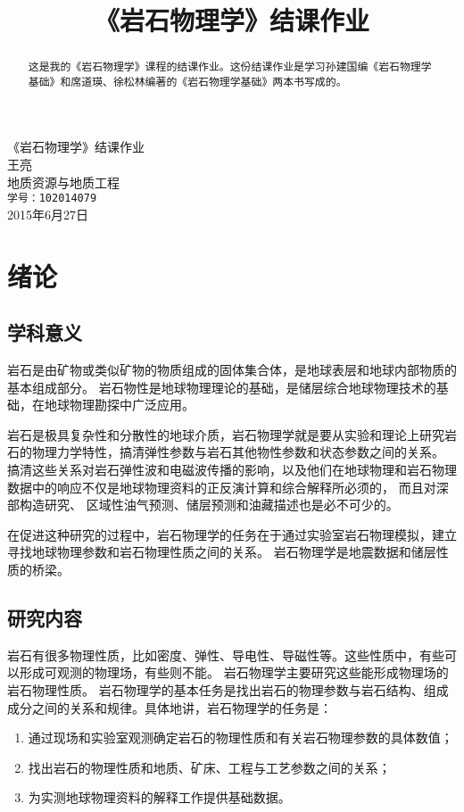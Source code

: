 \documentclass[hyperref,UTF-8,twoside]{ctexart}
\title{\heiti 《岩石物理学》结课作业}
\begin{document}
\begin{titlepage}
\vspace*{40mm}
\begin{center}
{\heiti\Huge 《岩石物理学》结课作业}\\[30mm]%
{\Large 王亮}\\[5mm]%
地质资源与地质工程\\\texttt{学号：102014079}\\[80mm]%
2015年6月27日%
\end{center}
\end{titlepage} 
\newpage
\thispagestyle{empty}
\mbox{} 
\newpage
{}
\tableofcontents
\newpage
\begin{abstract}
这是我的《岩石物理学》课程的结课作业。这份结课作业是学习孙建国编《岩石物理学基础》和席道瑛、徐松林编著的《岩石物理学基础》两本书写成的。
\end{abstract}
\section{绪论}
\subsection{学科意义}
岩石是由矿物或类似矿物的物质组成的固体集合体，是地球表层和地球内部物质的基本组成部分。
岩石物性是地球物理理论的基础，是储层综合地球物理技术的基础，在地球物理勘探中广泛应用。

岩石是极具复杂性和分散性的地球介质，岩石物理学就是要从实验和理论上研究岩石的物理力学特性，搞清弹性参数与岩石其他物性参数和状态参数之间的关系。
搞清这些关系对岩石弹性波和电磁波传播的影响，以及他们在地球物理和岩石物理数据中的响应不仅是地球物理资料的正反演计算和综合解释所必须的，
而且对深部构造研究、
区域性油气预测、储层预测和油藏描述也是必不可少的。

在促进这种研究的过程中，岩石物理学的任务在于通过实验室岩石物理模拟，建立寻找地球物理参数和岩石物理性质之间的关系。
岩石物理学是地震数据和储层性质的桥梁。
\subsection{研究内容}
岩石有很多物理性质，比如密度、弹性、导电性、导磁性等。这些性质中，有些可以形成可观测的物理场，有些则不能。
岩石物理学主要研究这些能形成物理场的岩石物理性质。
岩石物理学的基本任务是找出岩石的物理参数与岩石结构、组成成分之间的关系和规律。具体地讲，岩石物理学的任务是：
\begin{enumerate}
\item 通过现场和实验室观测确定岩石的物理性质和有关岩石物理参数的具体数值；
\item 找出岩石的物理性质和地质、矿床、工程与工艺参数之间的关系；
\item 为实测地球物理资料的解释工作提供基础数据。
\end{enumerate}
\end{document}
